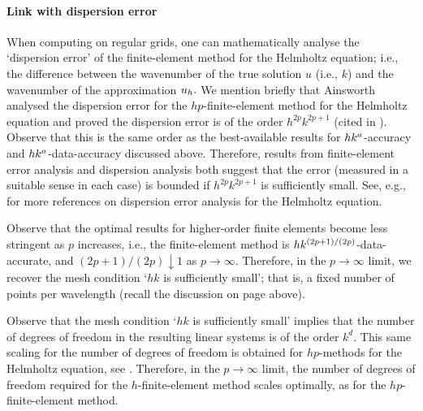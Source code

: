 \paragraph{Link with dispersion error} When computing on regular grids, one can mathematically analyse the `dispersion error' of the finite-element method for the Helmholtz equation; i.e., the difference between the wavenumber of the true solution $u$ (i.e., $k$) and the wavenumber of the approximation $u_{h}.$ We mention briefly that Ainsworth  analysed the dispersion error for the $hp$-finite-element method for the Helmholtz equation and proved the dispersion error is of the order $h^{2p}k^{2p+1}$ \cite[Equation (3.5)]{Ai:04} (cited in \cite[Remark 5.3(a)]{DuWu:15}). Observe that this is the same order as the best-available results for $hk^{a}$-accuracy and $hk^{a}$-data-accuracy discussed above. Therefore, results from finite-element error analysis and dispersion analysis both suggest that the error (measured in a suitable sense in each case) is bounded if $h^{2p}k^{2p+1}$ is sufficiently small. See, e.g., \cite[Remark 5.3(a)]{DuWu:15} for more references on dispersion error analysis for the Helmholtz equation.

Observe that the optimal results for higher-order finite elements become less stringent as $p$ increases, i.e., the finite-element method is $hk^{(2p+1)/(2p)}$-data-accurate, and $(2p+1)/(2p) \downarrow 1$ as $p \rightarrow \infty.$ Therefore, in the $p\rightarrow \infty$ limit, we recover the mesh condition `$hk$ is sufficiently small'; that is, a fixed number of points per wavelength (recall the discussion on page \pageref{page:ppw} above).

Observe that the mesh condition `$hk$ is sufficiently small' implies that the number of degrees of freedom in the resulting linear systems is of the order $k^d.$ This same scaling for the number of degrees of freedom is obtained for $hp$-methods for the Helmholtz equation, see \cite[Remark 5.9]{MeSa:11}. Therefore, in the $p\rightarrow\infty$ limit, the number of degrees of freedom required for the $h$-finite-element method scales optimally, as for the $hp$-finite-element method.
\ere


